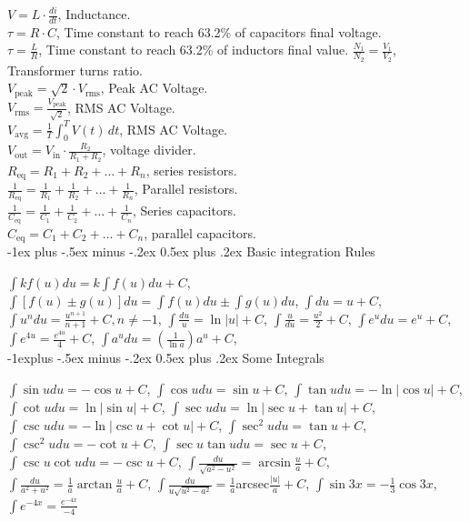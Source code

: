 \documentclass[10pt,landscape]{article}
\makeatletter
\renewcommand{\section}{\@startsection{section}{1}{0mm}%
                                {-1ex plus -.5ex minus -.2ex}%
                                {0.5ex plus .2ex}%
                                {\normalfont\large\bfseries}}
\renewcommand{\subsection}{\@startsection{subsection}{2}{0mm}%
                                {-1explus -.5ex minus -.2ex}%
                                {0.5ex plus .2ex}%
                                {\normalfont\normalsize\bfseries}}
\makeatother
\begin{document}
\begin{multicols}{3}
$V = L \cdot \frac{di}{dt}$, Inductance.\\
$\tau = R \cdot C$, Time constant to reach 63.2\% of capacitors final voltage.\\
$\tau = \frac{L}{R}$, Time constant to reach 63.2\% of inductors final value.
$\frac{N_1}{N_2} = \frac{V_1}{V_2}$, Transformer turns ratio.\\
$V_{\text{peak}} = \sqrt{2} \cdot V_{\text{rms}}$, Peak AC Voltage.\\
$V_{\text{rms}} = \frac{V_{\text{peak}}}{\sqrt{2}}$, RMS AC Voltage.\\
$V_{\text{avg}} = \frac{1}{T} \int_0^T V(t) \, dt$, RMS AC Voltage.\\
$V_{\text{out}} = V_{\text{in}} \cdot \frac{R_2}{R_1 + R_2}$, voltage divider.\\
$R_{\text{eq}} = R_1 + R_2 + \ldots + R_n$, series resistors.\\
$\frac{1}{R_{\text{eq}}} = \frac{1}{R_1} + \frac{1}{R_2} + \ldots + \frac{1}{R_n}$, Parallel resistors.\\
$\frac{1}{C_{\text{eq}}} = \frac{1}{C_1} + \frac{1}{C_2} + \ldots + \frac{1}{C_n}$, Series capacitors.\\
$C_{\text{eq}} = C_1 + C_2 + \ldots + C_n$, parallel capacitors.\\






\section{Basic integration Rules}

$\int kf(u) du = k \int f(u) du + C$, $\int [f(u) \pm g(u)]du = \int f(u) du \pm \int g(u) du$, 
$\int du = u +C$, $\int u^n du = \frac{u^{n+1}}{n+1} +C, n \neq -1$, $\int \frac{du}{u} = \ln |u| +C$, $\int \frac{u}{du} = \frac{u^2}{2} +C$,
$\int e^u du = e^u +C$,$\int e^{4u} = \frac{e^{4u}}{4} +C$, $\int a^u du = \left( \frac{1}{\ln a} \right) a^u +C$, \\

\subsection{Some Integrals}

$\int \sin u du = -\cos u+C$, $\int \cos u du = \sin u +C$,
$\int \tan u du = -\ln| \cos u | +C$, $\int \cot u du = \ln| \sin u | +C$, $\int \sec u du = \ln| \sec u + \tan u | +C$,
$\int \csc u du = -\ln| \csc u + \cot u | +C$, $\int \sec^2 u du = \tan u +C$, $\int \csc^2 u du = -\cot u +C$,
$\int \sec u \tan u du = \sec u +C$, $\int \csc u \cot u du = -\csc u +C$, $\int \frac{du}{\sqrt{a^2-u^2}} = \arcsin \frac{u}{a} +C$,
$\int \frac{du}{a^2+u^2} = \frac{1}{a} \arctan \frac{u}{a} +C$,
$\int \frac{du}{u\sqrt{u^2-a^2}} = \frac{1}{a} $arcsec$ \frac{|u|}{a} +C$, $\int \sin 3x = -\frac{1}{3} \cos 3x$, $\int e^{-4x} = \frac{e^{-4x}}{-4}$


\end{multicols}
\end{document}
